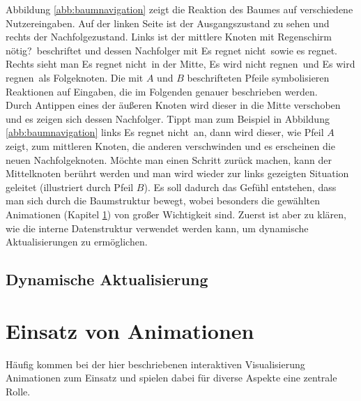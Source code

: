 Abbildung \ref{abb:baumnavigation} zeigt die Reaktion des Baumes auf verschiedene Nutzereingaben. Auf der linken Seite ist der Ausgangszustand zu sehen und rechts der Nachfolgezustand. Links ist der mittlere Knoten mit \glqq Regenschirm nötig?\grqq\ beschriftet und dessen Nachfolger mit \glqq Es regnet nicht\grqq\ sowie \glqq es regnet\grqq. Rechts sieht man \glqq Es regnet nicht\grqq\ in der Mitte, \glqq Es wird nicht regnen\grqq\ und \glqq Es wird regnen\grqq\ als Folgeknoten. Die mit $A$ und $B$ beschrifteten Pfeile symbolisieren Reaktionen auf Eingaben, die im Folgenden genauer beschrieben werden. \\Durch Antippen eines der äußeren Knoten wird dieser in die Mitte verschoben und es zeigen sich dessen Nachfolger. Tippt man zum Beispiel in Abbildung \ref{abb:baumnavigation} links \glqq Es regnet nicht\grqq\ an, dann wird dieser, wie Pfeil $A$ zeigt, zum mittleren Knoten, die anderen verschwinden und es erscheinen die neuen Nachfolgeknoten. Möchte man einen Schritt zurück machen, kann der Mittelknoten berührt werden und man wird wieder zur links gezeigten Situation geleitet (illustriert durch Pfeil $B$). Es soll dadurch das Gefühl entstehen, dass man sich durch die Baumstruktur bewegt, wobei besonders die gewählten Animationen (Kapitel \ref{sec:animation}) von großer Wichtigkeit sind. Zuerst ist aber zu klären, wie die interne Datenstruktur verwendet werden kann, um dynamische Aktualisierungen zu ermöglichen.
  
\subsection{Dynamische Aktualisierung}

 
\section{Einsatz von Animationen}\label{sec:animation}
Häufig kommen bei der hier beschriebenen interaktiven Visualisierung Animationen zum Einsatz und spielen dabei für diverse Aspekte eine zentrale Rolle. 

